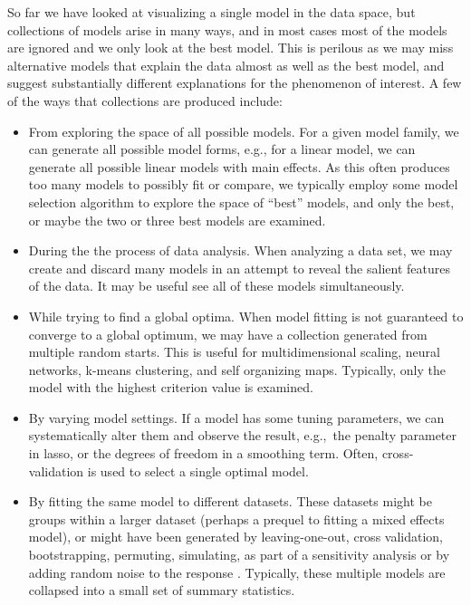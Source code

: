 \documentclass[preprint]{imsart}
\begin{document}
So far we have looked at visualizing a single model in the data space, but collections of models arise in many ways, and in most cases most of the models are ignored and we only look at the best model. This is perilous as we may miss alternative models that explain the data almost as well as the best model, and suggest substantially different explanations for the phenomenon of interest. A few of the ways that collections are produced include:

\begin{itemize} \itemsep 0in
  \item From exploring the space of all possible models.  For a given model family, we can generate all possible model forms, e.g., for a linear model, we can generate all possible linear models with main effects.  As this  often produces too many models to possibly fit or compare, we typically employ some model selection algorithm to explore the space of ``best'' models, and only the best, or maybe the two or three best models are examined.

  \item During the the process of data analysis.  When analyzing a data set, we may create and discard many models in an attempt to reveal the salient features of the data.  It may be useful see all of these models simultaneously.

  \item While trying to find a global optima. When model fitting is not guaranteed to converge to a global optimum, we may have a collection generated from multiple random starts.  This is useful for multidimensional scaling, neural networks, k-means clustering, and self organizing maps.  Typically, only the model with the highest criterion value is examined.


  \item By varying model settings.  If a model has some tuning parameters, we can systematically alter them and observe the result, e.g.,\ the penalty parameter in lasso, or the degrees of freedom in a smoothing term.  Often, cross-validation is used to select a single optimal model.

  \item By fitting the same model to different datasets.  These datasets might be groups within a larger dataset (perhaps a prequel to fitting a mixed effects model), or might have been generated by leaving-one-out, cross validation, bootstrapping, permuting, simulating, as part of a sensitivity analysis or by adding random noise to the response \citep{luo:2006}.  Typically, these multiple models are collapsed into a small set of summary statistics.


\end{itemize}
\end{document}
